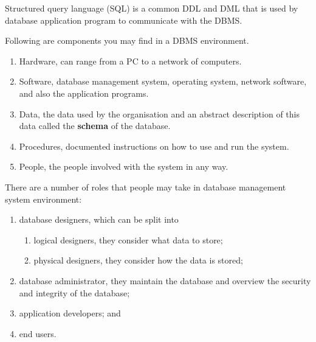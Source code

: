 \begin{example}
    Structured query language (SQL) is a common DDL and DML that is used by database application program to communicate with the DBMS.
\end{example}

\begin{definition}
    Following are components you may find in a DBMS environment.
    
    \begin{enumerate}
        \item Hardware, can range from a PC to a network of computers.
        
        \item Software, database management system, operating system, network software, and also the application programs. 
        
        \item Data, the data used by the organisation and an abstract description of this data called the \textbf{schema} of the database.
        
        \item Procedures, documented instructions on how to use and run the system.
        
        \item People, the people involved with the system in any way.
    \end{enumerate}
\end{definition}

\begin{definition}
    There are a number of roles that people may take in database management system environment:
    \begin{enumerate}
        \item database designers, which can be split into
        \begin{enumerate}
            \item logical designers, they consider what data to store;
            \item physical designers, they consider how the data is stored;
        \end{enumerate}
        \item database administrator, they maintain the database and overview the security and integrity of the database;
        \item application developers; and
        \item end users.
    \end{enumerate}
\end{definition}

